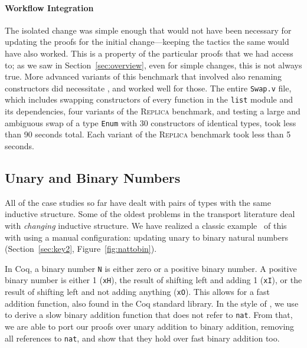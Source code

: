 \paragraph{Workflow Integration}
The isolated change was simple enough that \toolname would not have been necessary
for updating the proofs for the initial change---keeping the tactics the same would have also worked.
This is a property of the particular proofs that we had access to;
as we saw in Section~\ref{sec:overview}, even for simple changes, this is not always true.
More advanced variants of this benchmark that involved also renaming constructors did necessitate \toolname,
and \toolname worked well for those. %
The entire \lstinline{Swap.v} file, which includes swapping constructors of every function in the \lstinline{list} module and
its dependencies, four variants of the \textsc{Replica} benchmark,
and testing a large and ambiguous swap of a type \lstinline{Enum} with 30 constructors of identical types,
took \toolname less than 90 seconds total. %
Each variant of the \textsc{Replica} benchmark took \toolname less than 5 seconds. %

\subsection{Unary and Binary Numbers}
\label{sec:bin}

All of the case studies so far have dealt with pairs of types with the same inductive structure.
Some of the oldest problems in the transport literature deal with \textit{changing} inductive
structure.
We have realized a classic example~\cite{magaud2000changing}  of this with \toolname using a manual configuration:
updating unary to binary natural numbers (Section~\ref{sec:key2}, Figure~\ref{fig:nattobin}).

In Coq, a binary number \lstinline{N} is either zero or a positive binary number. A positive binary number
is either 1 (\lstinline{xH}), the result of shifting left and adding 1 (\lstinline{xI}),
or the result of shifting left and not adding anything (\lstinline{xO}).
This allows for a fast addition function, also found in the Coq standard library.
In the style of \citet{magaud2000changing}, we use \toolname to derive a slow binary
addition function that does not refer to \lstinline{nat}.
From that, we are able to port our proofs over unary addition to binary addition,
removing all references to \lstinline{nat}, and show that they hold over fast binary addition too.

